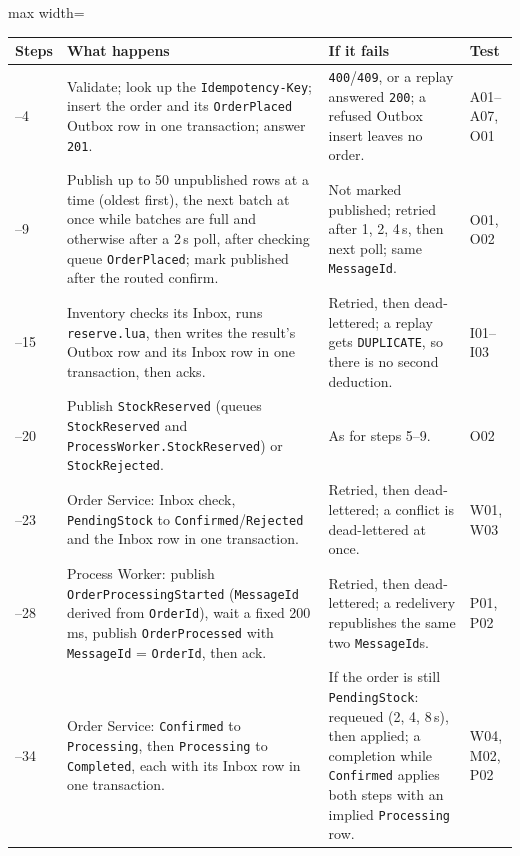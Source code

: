 \documentclass[a4paper]{report}
\begin{document}
\begin{table}[tbp]
\centering
\small
\begin{adjustbox}{max width=\linewidth}
\begin{tabular}{@{}>{\raggedright\arraybackslash}p{1.1cm}>{\raggedright\arraybackslash}p{5.6cm}>{\raggedright\arraybackslash}p{5.4cm}>{\raggedright\arraybackslash}p{1.6cm}@{}}
\toprule
Steps & What happens & If it fails & Test \\
\midrule
1--4 & Validate; look up the \texttt{Idempotency-Key}; insert the order and
its \texttt{OrderPlaced} Outbox row in one transaction; answer \texttt{201}. &
\texttt{400}/\texttt{409}, or a replay answered \texttt{200}; a refused
Outbox insert leaves no order. & A01--\allowbreak A07, O01 \\
5--9 & Publish up to 50 unpublished rows at a time (oldest first), the next
batch at once while batches are full and otherwise after a 2\,s poll, after
checking queue \texttt{OrderPlaced}; mark published after the routed
confirm. & Not marked published; retried after 1, 2, 4\,s, then next poll;
same \texttt{MessageId}. & O01, O02 \\
10--15 & Inventory checks its Inbox, runs \texttt{reserve.lua}, then writes
the result's Outbox row and its Inbox row in one transaction, then acks. &
Retried, then dead-lettered; a replay gets \texttt{DUPLICATE}, so there is
no second deduction. & I01--\allowbreak I03 \\
16--20 & Publish \texttt{StockReserved} (queues \texttt{StockReserved} and
\texttt{ProcessWorker.\allowbreak StockReserved}) or \texttt{StockRejected}. & As for
steps 5--9. & O02 \\
21--23 & Order Service: Inbox check, \texttt{PendingStock} to
\texttt{Confirmed}/\allowbreak\texttt{Rejected} and the Inbox row in one transaction. &
Retried, then dead-lettered; a conflict is dead-lettered at once. & W01,
W03 \\
24--28 & Process Worker: publish \texttt{OrderProcessing\allowbreak Started} (\texttt{MessageId} derived from \texttt{OrderId}), wait a fixed 200\,ms, publish \texttt{OrderProcessed} with \texttt{MessageId} = \texttt{OrderId}, then ack. & Retried, then dead-lettered; a redelivery republishes the same two \texttt{MessageId}s. & P01, P02 \\
29--34 & Order Service: \texttt{Confirmed} to \texttt{Processing}, then \texttt{Processing} to \texttt{Completed}, each with its Inbox row in one transaction. & If the order is still \texttt{PendingStock}: requeued (2, 4, 8\,s), then applied; a completion while \texttt{Confirmed} applies both steps with an implied \texttt{Processing} row. & W04, M02, P02 \\

\end{tabular}
\end{adjustbox}
\end{table}
\end{document}
